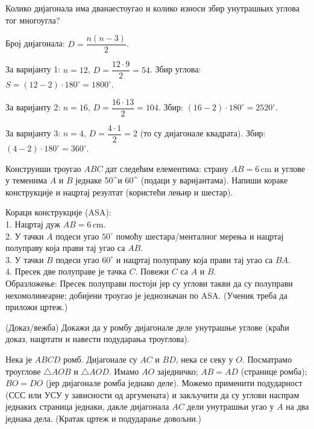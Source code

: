 \documentclass[10pt,a5paper,addpoints]{exam}
\newcommand{\measure}[2]{#1\,\mathrm{#2}}
\def\variant#1#2#3{#1}
\begin{document}
\begin{questions}
\question[3]
Колико дијагонала има \variant{дванаестоугао}{шеснаестоугао}{четвороугао} и колико износи збир унутрашњих углова тог многоугла?
\begin{solution}
Број дијагонала: $D=\dfrac{n(n-3)}2$.

За варијанту 1: $n=12$,
$D=\dfrac{12\cdot9}{2}=54$. Збир углова: $S=(12-2)\cdot180^\circ=1800^\circ$.

За варијанту 2: $n=16$,
$D=\dfrac{16\cdot13}{2}=104$. Збир: $(16-2)\cdot180^\circ=2520^\circ$.

За варијанту 3: $n=4$,
$D=\dfrac{4\cdot1}{2}=2$ (то су дијагонале квадрата). Збир: $(4-2)\cdot180^\circ=360^\circ$.
\end{solution}

\question[4]
Конструиши троугао $ABC$ дат следећим елементима: страну $AB=\measure{\variant{6}{5}{7}}{cm}$ и углове у теменима $A$ и $B$ једнаке \variant{50^\circ и 60^\circ}{40^\circ и 50^\circ}{55^\circ и 45^\circ} (подаци у варијантама). Напиши кораке конструкције и нацртај резултат (користећи лењир и шестар).
\begin{solution}
Кораци конструкције (ASA): \\
1. Нацртај дуж $AB=\measure{\variant{6}{5}{7}}{cm}$. \\
2. У тачки $A$ подеси угао $ \variant{50^\circ}{40^\circ}{55^\circ}$ помоћу шестара/менталног мерења и нацртај полуправу која прави тај угао са $AB$. \\
3. У тачки $B$ подеси угао $ \variant{60^\circ}{50^\circ}{45^\circ}$ и нацртај полуправу која прави тај угао са $BA$. \\
4. Пресек две полуправе је тачка $C$. Повежи $C$ са $A$ и $B$. \\
Образложење: Пресек полуправи постоји јер су углови такви да су полуправи нехомолинеарне; добијени троугао је једнозначан по ASA. (Ученик треба да приложи цртеж.)
\end{solution}

\question[4]
(Доказ/вежба) Докажи да у ромбу дијагонале деле унутрашње углове (краћи доказ, нацртати и навести подударања троуглова).
\begin{solution}
Нека је $ABCD$ ромб. Дијагонале су $AC$ и $BD$, нека се секу у $O$. Посматрамо троуглове $\triangle AOB$ и $\triangle AOD$. Имамо $AO$ заједничко; $AB=AD$ (странице ромба); $BO=DO$ (јер дијагонале ромба једнако деле). Можемо применити подударност (ССС или УСУ у зависности од аргумената) и закључити да су углови наспрам једнаких страница једнаки, дакле дијагонала $AC$ дели унутрашњи угао у $A$ на два једнака дела. (Кратак цртеж и подударање довољни.)
\end{solution}


\end{questions}
\end{document}
